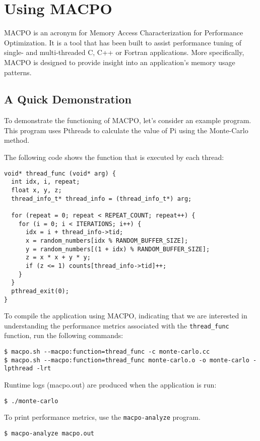 \chapter{Using MACPO}
MACPO is an acronym for Memory Access Characterization for Performance Optimization. It is a tool that has been built to assist performance tuning of single- and multi-threaded C, C++ or Fortran applications. More specifically, MACPO is designed to provide insight into an application's memory usage patterns.

\section{A Quick Demonstration}
To demonstrate the functioning of MACPO, let's consider an example program. This program uses Pthreads to calculate the value of Pi using the Monte-Carlo method.

The following code shows the function that is executed by each thread:

\begin{verbatim}
void* thread_func (void* arg) {
  int idx, i, repeat;
  float x, y, z;
  thread_info_t* thread_info = (thread_info_t*) arg;

  for (repeat = 0; repeat < REPEAT_COUNT; repeat++) {
    for (i = 0; i < ITERATIONS; i++) {
      idx = i + thread_info->tid;
      x = random_numbers[idx % RANDOM_BUFFER_SIZE];
      y = random_numbers[(1 + idx) % RANDOM_BUFFER_SIZE];
      z = x * x + y * y;
      if (z <= 1) counts[thread_info->tid]++;
    }
  }
  pthread_exit(0);
}
\end{verbatim}

To compile the application using MACPO, indicating that we are interested in understanding the performance metrics associated with the \texttt{thread\_func} function, run the following commands:
\begin{verbatim}
$ macpo.sh --macpo:function=thread_func -c monte-carlo.cc
$ macpo.sh --macpo:function=thread_func monte-carlo.o -o monte-carlo -lpthread -lrt
\end{verbatim}

Runtime logs (macpo.out) are produced when the application is run:
\begin{verbatim}
$ ./monte-carlo
\end{verbatim}

To print performance metrics, use the \texttt{macpo-analyze} program.
\begin{verbatim}
$ macpo-analyze macpo.out
\end{verbatim}

